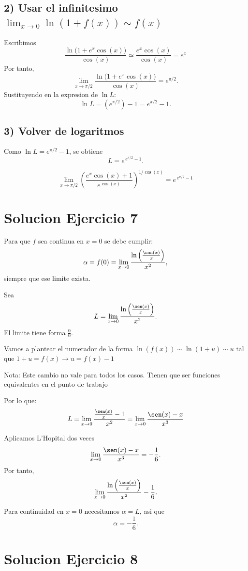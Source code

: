 \documentclass[12pt]{article}
\begin{document}
\subsection*{2) Usar el infinitesimo $\displaystyle \lim_{x\to 0}\ln(1+f(x)) \sim f(x)$}
Escribimos
\[
\frac{\ln\bigl(1+e^x\cos(x)\bigr)}{\cos(x)} \simeq \frac{e^x\cos(x)}{\cos(x)} = e^x
\]
Por tanto,
\[
\lim_{x\to \pi/2}\frac{\ln\bigl(1+e^x\cos(x)\bigr)}{\cos(x)} = e^{\pi/2}.
\]
Sustituyendo en la expresion de $\ln L$:
\[
\ln L=\left(e^{\pi/2}\right)-1=e^{\pi/2}-1.
\]

\subsection*{3) Volver de logaritmos}
Como $\ln L=e^{\pi/2}-1$, se obtiene
\[
L=e^{\,e^{\pi/2}-1}.
\]

\[
\boxed{\displaystyle \lim_{x\to \pi/2}\left(\frac{e^x\cos(x)+1}{e^{\cos(x)}}\right)^{1/\cos(x)}
= e^{\,e^{\pi/2}-1}}
\]

\section*{Solucion Ejercicio 7}

Para que $f$ sea continua en $x=0$ se debe cumplir:
\[
\alpha=f(0)=\lim_{x\to 0}\frac{\ln\left(\frac{\sen(x)}{x}\right)}{x^2},
\]
siempre que ese limite exista.

Sea
\[
L=\lim_{x\to 0}\frac{\ln\left(\frac{\sen(x)}{x}\right)}{x^2}.
\]
El limite tiene forma $\frac{0}{0}$.

Vamos a plantear el numerador de la forma $\ln(f(x)) \sim \ln(1 + u) \sim u$ tal que $1+u = f(x) \rightarrow u = f(x) - 1$

Nota: Este cambio no vale para todos los casos. Tienen que ser funciones equivalentes en el punto de trabajo

Por lo que:
\[
L=\lim_{x\to 0}\frac{\frac{\sen(x)}{x} - 1}{x^2} = \lim_{x\to 0}\frac{\sen(x)-x}{x^3}
\]

Aplicamos L'Hopital dos veces
\[
\lim_{x\to 0}\frac{\sen(x)-x}{x^3}=-\frac{1}{6}.
\]
Por tanto,
\[
\lim_{x\to 0}\frac{\ln\left(\frac{\sen(x)}{x}\right)}{x^2}-\frac{1}{6}.
\]

Para continuidad en $x=0$ necesitamos $\alpha=L$, asi que
\[
\boxed{\alpha=-\frac{1}{6}}.
\]

\section*{Solucion Ejercicio 8}
\end{document}
